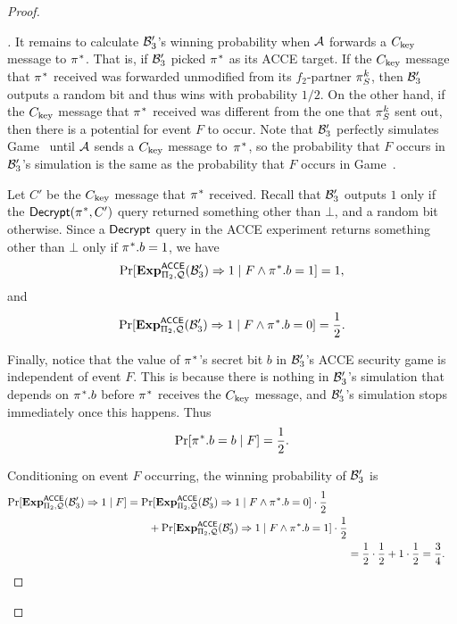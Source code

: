 \begin{proof}
\begin{proof}[]
\medskip
It remains to calculate $\A[B]'_3$'s winning probability when $\A$ forwards a $\Ckey$ message to $\oracle^*$.
That is,
if $\A[B]'_3$ picked $\oracle^*$ as its ACCE target.
If the $\Ckey$ message that $\oracle^*$ received  was forwarded unmodified from its $f_2$-partner $\oracle[S][k]$,
then $\A[B]'_3$ outputs a random bit and thus wins with probability $1 / 2$.
On the other hand,
if the $\Ckey$ message that $\oracle^*$ received was different from the one that $\oracle[S][k]$ sent out,
then there is a potential for event $F$ to occur. 
Note that $\A[B]'_3$ perfectly simulates Game~\prevgame{} until $\A$ sends a $\Ckey$ message to~$\oracle^*$,
so the probability that $F$ occurs in $\A[B]'_3$'s simulation is the same as the probability that $F$ occurs in Game~\prevgame{}.

Let $C'$ be the $\Ckey$ message that $\oracle^*$ received.
Recall that $\A[B]'_3$ outputs $1$ only if the $\Decrypt(\oracle^*, C')$ query returned something other than $\bot$,
and a random bit otherwise.
Since a $\Decrypt$ query in the ACCE experiment returns something other than $\bot$ only if $\oracle^*.b = 1$,
we have 
\begin{equation}
	\Pr[\Exp_{\protocol_2,\queryset}^{\acce}(\A[B]'_3) \Rightarrow 1 \mid F \land \oracle^*.b = 1] = 1,
\end{equation}
and 
\begin{equation}
	\Pr[\Exp_{\protocol_2,\queryset}^{\acce}(\A[B]'_3) \Rightarrow 1 \mid F \land \oracle^*.b = 0] = \frac{1}{2}.
\end{equation}

Finally,
notice that the value of $\oracle^*$'s secret bit $b$ in $\A[B]'_3$'s ACCE security game is independent of event $F$.
This is because there is nothing in $\A[B]'_3$'s simulation that depends on $\oracle^*.b$ before $\oracle^*$ receives the $\Ckey$ message,
and $\A[B]'_3$'s simulation stops immediately once this happens.
Thus 
\begin{equation}
	\Pr[\oracle^*.b = b \mid F] = \frac{1}{2} .
\end{equation}

Conditioning on event $F$ occurring, the winning probability of  $\A[B]'_3$ is
\small
\begin{align}
	\begin{split}
		\Pr[\Exp_{\protocol_2,\queryset}^{\acce}(\A[B]'_3) \Rightarrow 1 \mid F] &=
			\Pr[\Exp_{\protocol_2,\queryset}^{\acce}(\A[B]'_3) \Rightarrow 1 \mid F \land \oracle^*.b = 0] \cdot \frac{1}{2}	\\
			&\qquad + \Pr[\Exp_{\protocol_2,\queryset}^{\acce}(\A[B]'_3) \Rightarrow 1 \mid F \land \oracle^*.b = 1] \cdot 	\frac{1}{2} 
	\end{split} \\
		&= \frac{1}{2} \cdot \frac{1}{2} + 1 \cdot \frac{1}{2} = \frac{3}{4} .
\end{align}
\normalsize


\end{proof}
\end{proof}
